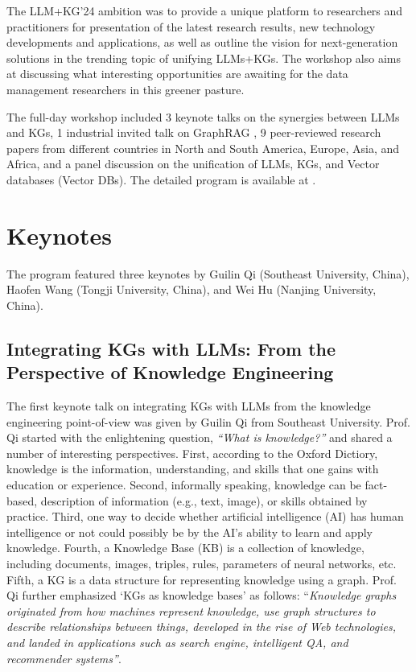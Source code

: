\documentclass{sig-alternate-10pt}
\begin{document}
\smallskip

The LLM+KG'24 ambition was to provide a unique platform to researchers and practitioners for presentation of the latest research results, new technology developments and applications, as well as outline the vision for next-generation solutions in the trending topic of unifying LLMs+KGs. The workshop also aims at discussing what interesting opportunities are awaiting for the data management researchers in this greener pasture.


The full-day workshop included 3 keynote talks on the synergies between LLMs and KGs, 1 industrial invited talk on GraphRAG \cite{graphrag}, 9 peer-reviewed research papers from different countries in North and South America, Europe, Asia, and Africa, and a panel discussion on the unification of LLMs, KGs, and Vector databases (Vector DBs). The detailed program is available at \cite{KWC24}.

\vspace{-2mm}
\section{Keynotes}
\label{sec:keynotes}

\medskip
\medskip

The program featured three keynotes by Guilin Qi (Southeast University, China), Haofen Wang (Tongji University, China), and Wei Hu (Nanjing University, China). 

\subsection{Integrating KGs with LLMs: From the Perspective of Knowledge Engineering}
\label{sec:keynote1}

\medskip
\medskip

The first keynote talk on integrating KGs with LLMs from the knowledge engineering point-of-view was given
by Guilin Qi from Southeast University. Prof. Qi started with the enlightening question, {\em ``What is knowledge?''} and shared a number of interesting perspectives. First, according to the Oxford Dictiory, knowledge is the information, understanding, and skills that one gains with education or experience. Second, informally speaking, knowledge can be fact-based,
description of information (e.g., text, image), or skills obtained by practice.
Third, one way to decide whether artificial intelligence (AI) has human intelligence or not could possibly be by the AI's ability to learn and apply knowledge. Fourth, a Knowledge Base (KB) is a collection of knowledge, including documents, images, triples, rules, parameters of neural
networks, etc. Fifth, a KG is a data structure for representing
knowledge using a graph. Prof. Qi further emphasized `KGs as knowledge bases' as follows: ``{\em Knowledge graphs originated from how machines represent knowledge, use graph structures to describe relationships between things, developed in the rise of Web technologies, and landed in applications such as search engine, intelligent QA, and recommender systems''}.
\end{document}
